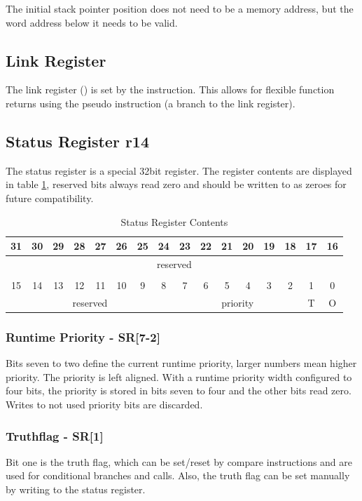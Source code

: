 The initial stack pointer position does not need to be a memory address,
but the word address below it needs to be valid.

\subsection{Link Register}
The link register () is set by the  instruction.
This allows for flexible function returns using the pseudo instruction  (a branch to the link register).
\subsection{Status Register r14}
The status register is a special 32bit register.
The register contents are displayed in table \ref{tbl:SR}, reserved bits always read zero and should be written to as zeroes for future compatibility.
\begin{table}
\center
\begin{tabular}{|c|c|c|c|c|c|c|c|c|c|c|c|c|c|c|c|}
\hline 
31 & 30 & 29 & 28 & 27 & 26 & 25 & 24 & 23 & 22 & 21 & 20 & 19 & 18 & 17 & 16\\ 
\hline 
\multicolumn{16}{|c|}{reserved}\\
\hline
\multicolumn{16}{c}{}\\
\hline 
15 & 14 & 13 & 12 & 11 & 10 & 9 & 8 & 7 & 6 & 5 & 4 & 3 & 2 & 1 & 0 \\
\hline 
\multicolumn{8}{|c|}{reserved} & \multicolumn{6}{|c|}{priority} & T & O \\
\hline
\end{tabular}
\caption{Status Register Contents}
\label{tbl:SR}
\end{table}

\subsubsection{Runtime Priority - SR[7-2]}
Bits seven to two define the current runtime priority, larger numbers mean higher priority. The priority is left aligned.
With a runtime priority width configured to four bits, the priority is stored in bits seven to four and the other bits read zero.
Writes to not used priority bits are discarded.

\subsubsection{Truthflag - SR[1]}
Bit one is the truth flag, which can be set/reset by compare instructions and are used for conditional branches and calls.
Also, the truth flag can be set manually by writing to the status register.

